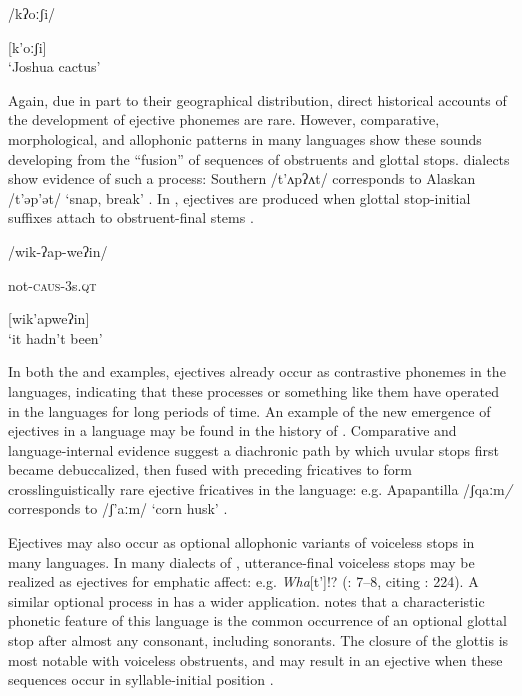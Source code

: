 \ea\label{ex:4.42}

/kʔoːʃi/

[k’oːʃi]\\
\glt ‘Joshua cactus’
\citep[16]{Newman1965}
\z

  Again, due in part to their geographical distribution, direct historical accounts of the development of ejective phonemes are rare. However, comparative, morphological, and allophonic patterns in many languages show these sounds developing from the ``fusion'' of sequences of obstruents and glottal stops.  dialects show evidence of such a process: Southern  /t’ʌpʔʌt/ corresponds to Alaskan  /t’əp’ət/ ‘snap, break’ \citep[312]{Fallon2002}. In , ejectives are produced when glottal stop-initial suffixes attach to obstruent-final stems .

\ea\label{ex:4.43}

/wik-ʔap-weʔin/

not-\textsc{caus}-3s.\textsc{qt}

[wik’apweʔin]\\
\glt ‘it hadn’t been’
\citep[69]{Stonham1999}
\z

  In both the  and  examples, ejectives already occur as contrastive phonemes in the languages, indicating that these processes or something like them have operated in the languages for long periods of time. An example of the new emergence of ejectives in a language may be found in the history of . Comparative and language-internal evidence suggest a diachronic path by which uvular stops first became debuccalized, then fused with preceding fricatives to form crosslinguistically rare ejective fricatives in the language: e.g. Apapantilla /ʃqaːm\textit{/} corresponds to  /ʃ’aːm/ ‘corn husk’ \citep[6]{Beck2006}.

  Ejectives may also occur as optional allophonic variants of voiceless stops in many languages. In many dialects of , utterance-final voiceless stops may be realized as ejectives for emphatic affect: e.g. \textit{Wha}[t’]!? (\citealt{Fallon2002}: 7--8, citing \citealt{Taylor1995}: 224). A similar optional process in  has a wider application. \citet{Vidal2001} notes that a characteristic phonetic feature of this language is the common occurrence of an optional glottal stop after almost any consonant, including sonorants. The closure of the glottis is most notable with voiceless obstruents, and may result in an ejective when these sequences occur in syllable-initial position .

